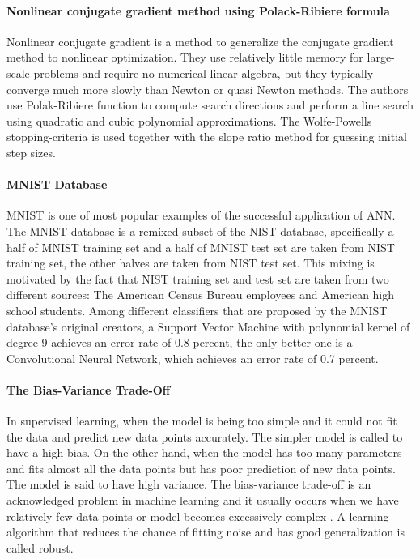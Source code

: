 \documentclass[conference]{IEEEtran}
\begin{document}
\paragraph{Nonlinear conjugate gradient method using Polack-Ribiere formula}
Nonlinear conjugate gradient is a method to generalize the conjugate gradient method to nonlinear optimization. They use relatively little memory for large-scale problems and require no numerical linear algebra, but they typically converge much more slowly than Newton or quasi Newton methods\cite{dennis1977quasi}. The authors use Polak-Ribiere function to compute search directions and perform a line search using quadratic and cubic polynomial approximations\cite{grippo1997globally}. The Wolfe-Powells stopping-criteria is used together with the slope ratio method for guessing initial step sizes\cite{wei2000new}.
\paragraph{MNIST Database}
MNIST is one of most popular examples of the successful application of ANN. The MNIST database is a remixed subset of the NIST database, specifically a half of MNIST training set and a half of MNIST test set are taken from NIST training set, the other halves are taken from NIST test set\cite{FastKNNClusterBasedTrees}. This mixing is motivated by the fact that NIST training set and test set are taken from two different sources: The American Census Bureau employees and American high school students\cite{MNISTHandWritten}. Among different classifiers that are proposed by the MNIST database's original creators, a Support Vector Machine with polynomial kernel of degree 9 achieves an error rate of 0.8 percent, the only better one is a Convolutional Neural Network, which achieves an error rate of 0.7 percent\cite{Lecun98gradient-basedlearning}.
\paragraph{The Bias-Variance Trade-Off}
In supervised learning, when the model is being too simple and it could not fit the data and predict new data points accurately. The simpler model is called to have a high bias. On the other hand, when the model has too many parameters and fits almost all the data points but has poor prediction of new data points. The model is said to have high variance. The bias-variance trade-off is an acknowledged problem in machine learning and it usually occurs when we have relatively few data points or model becomes excessively complex \cite{Geman:1992:NNBBiasDilemma, BiasVarianceDecomposition}. A learning algorithm that reduces the chance of fitting noise and has good generalization is called robust.	
\end{document}
